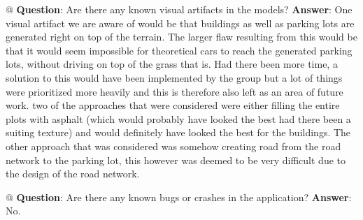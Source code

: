 \begin{easylist}
  @ \textbf{Question}: Are there any known visual artifacts in the models? \newline
  	\textbf{Answer}:  One visual artifact we are aware of would be that buildings as well as parking lots are generated right on top of the terrain.
	The larger flaw resulting from this would be that it would seem impossible for theoretical cars to reach the generated parking lots, without driving on top of the grass that is.
	Had there been more time, a solution to this would have been implemented by the group but a lot of things were prioritized more heavily and this is therefore also left as an area of future work. 
	two of the approaches that were considered were either filling the entire plots with asphalt (which would probably have looked the best had there been a suiting texture) and would definitely have looked the best for the buildings.
	The other approach that was considered was somehow creating road from the road network to the parking lot, this however was deemed to be very difficult due to the design of the road network. 
	
  @ \textbf{Question}: Are there any known bugs or crashes in the application? \newline
  	\textbf{Answer}: No. %
	
\end{easylist}
